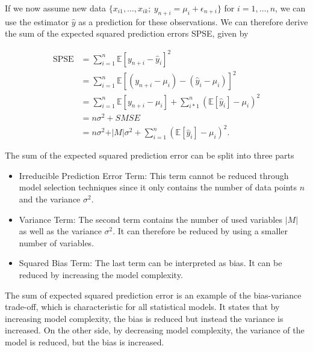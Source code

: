 \documentclass[10pt,a4paper]{article}
\begin{document}
If we now assume new data $\{ x_{i1}, \dots, x_{ik}; \ y_{n+i} = \mu_i + \epsilon_{n+i}\}$ for $i = 1, \dots, n$, we can use the estimator $\hat  y$ as a prediction for these observations. We can therefore derive the sum of the expected squared prediction errors SPSE, given by

\begin{equation}
\begin{split}
	\text{SPSE} &= \sum_{i=1}^n \mathbb{E}[y_{n+i} - \hat y_i]^2 \\ 
				&= \sum_{i=1}^n \mathbb{E}[(y_{n+i} - \mu_i) - (\hat y_i - \mu_i)]^2 \\ 
				&= \sum_{i=1}^n\mathbb{E}[y_{n+i} - \mu_i] + \sum_{i*1}^n(\mathbb{E}[\hat y_i] - \mu_i)^2 \\ 
				&= n\sigma^2 + SMSE \\ 
				&= n\sigma^2 + \vert M \vert \sigma^2 + \sum_{i=1}^n(\mathbb{E}[\hat y_i] - \mu_i)^2.
\end{split}
\end{equation}


The sum of the expected squared prediction error can be split into three parts

\begin{itemize}
	

\item Irreducible Prediction Error Term: This term cannot be reduced through model selection techniques since it only contains the number of data points $n$ and the variance $\sigma^2$.
\item Variance Term: The second term contains the number of used variables $\vert M \vert$ as well as the variance $\sigma^2$. It can therefore be reduced by using a smaller number of variables.
\item Squared Bias Term: The last term can be interpreted as bias. It can be reduced by increasing the model complexity.

\end{itemize}

The sum of expected squared prediction error is an example of the bias-variance trade-off, which is characteristic for all statistical models. It states that by increasing model complexity, the bias is reduced but instead the variance is increased. On the other side, by decreasing model complexity, the variance of the model is reduced, but the bias is increased. 

\end{document}
